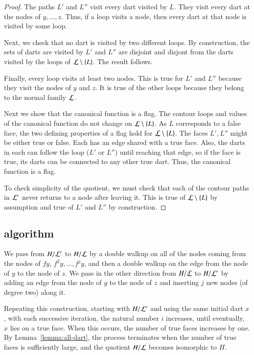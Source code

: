 \begin{proof} The paths $L'$ and $L''$ visit every dart visited by $L$.  They visit every dart at the nodes of $y,\ldots,z$.  Thus, if a loop visits a node, then every dart at that node is visited by some loop.

Next, we check that no dart is visited by two different loops.  By construction, the sets of darts are visited by $L'$ and $L''$ are disjoint and disjont from the darts visited by the loops of ${\cal L}\setminus \{L\}$.  The result follows.

Finally, every loop visits at least two nodes.  This is true for $L'$ and $L''$ because they visit the nodes of $y$ and $z$.  It is true of the other loops because they belong to the normal family ${\cal L}$.

Next we show that the canonical function is a flag. The contour loops and values of the canonical function do not change on ${\cal L}\setminus \{L\}$.  As $L$ corresponds to a false face, the two defining properties of a flag hold for ${\cal L}\setminus \{L\}$.  The faces $L',L''$ might be either true or false.  Each has an edge shared with a true face.  Also, the darts in each can follow the loop ($L'$ or $L''$) until reaching that edge, so if the face is true, its darts can be connected to any other true dart.  Thus, the canonical function is a flag.

To check simplicity of the quotient, we must check that each of the contour paths in ${\cal L}'$ never returns to a node after leaving it.  This is true of ${\cal L}\setminus\{L\}$ by assumption and true of $L'$ and $L''$ by construction.
\end{proof}

\subsection{algorithm}

We pass from  $H/{\cal L'}$ to $H/{\cal L}$ by a double walkup on all of the nodes coming from the nodes of $f y$, $f^2 y, \ldots, f^j y$, and then a double walkup on the edge from the node of $y$ to the node of $z$.  We pass in the other direction from $H/{\cal L}$ to $H/{\cal L'}$ by adding an edge from the node of $y$ to the node of $z$ and inserting $j$ new nodes (of degree two) along it.

Repeating this construction, starting with $H/{\cal L'}$ and using the same initial dart $x$, with each successive iteration, the natural number $i$ increases, until eventually, $x$ lies on a true face.  When this occurs, the number of true faces increases by one.  By Lemma~\ref{lemma:all-dart}, the process terminates when the number of true faces is sufficiently large, and the quotient $H/{\cal L}$ becomes isomorphic to $H$.


